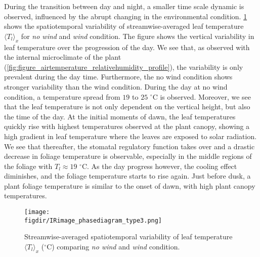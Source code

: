 During the transition between day and night, a smaller time scale dynamic is observed, influenced by the abrupt changing in the environmental condition. \cref{fig:IRimage_phasediagram_type3} shows the spatiotemporal variability of streamwise-averaged leaf temperature $\langle T_l \rangle_x $ for \textit{no wind} and \textit{wind} condition. The figure shows the vertical variability in leaf temperature over the progression of the day. We see that, as observed with the internal microclimate of the plant (\cref{fig:figure_airtemperature_relativehumidity_profile}), the variability is only prevalent during the day time. Furthermore, the no wind condition shows stronger variability than the wind condition. During the day at no wind condition, a temperature spread from $19$ to $25$ $^{\circ}$C is observed. Moreover, we see that the leaf temperature is not only dependent on the vertical height, but also the time of the day. At the initial moments of dawn, the leaf temperatures quickly rise with highest temperatures observed at the plant canopy, showing a high gradient in leaf temperature where the leaves are exposed to solar radiation. We see that thereafter, the stomatal regulatory function takes over and a drastic decrease in foliage temperature is observable, especially in the middle regions of the foliage with  $T_l \approx 19$ $^{\circ}$C. As the day progress however, the cooling effect diminishes, and the foliage temperature starts to rise again. Just before dusk, a plant foliage temperature is similar to the onset of dawn, with high plant canopy temperatures. 

	\begin{figure}[t]
	\centering
	\texttt{[image: \\figdir/IRimage\_phasediagram\_type3.png]}
	\caption{Streamwise-averaged spatiotemporal variability of leaf temperature $\langle T_l \rangle_x$ ($^{\circ}$C) comparing  \textit{no wind} and  \textit{wind} condition.}
	\label{fig:IRimage_phasediagram_type3}
	\end{figure}

